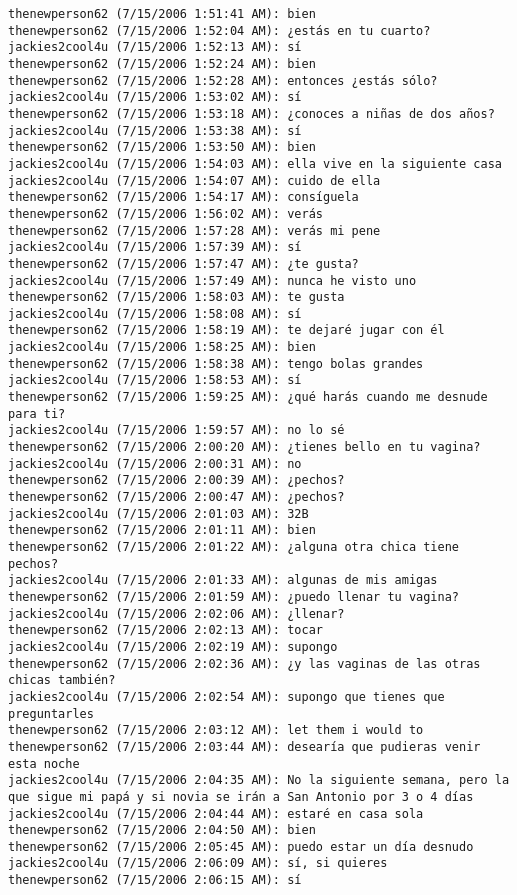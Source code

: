 \begin{verbatim}
thenewperson62 (7/15/2006 1:51:41 AM): bien
thenewperson62 (7/15/2006 1:52:04 AM): ¿estás en tu cuarto?
jackies2cool4u (7/15/2006 1:52:13 AM): sí
thenewperson62 (7/15/2006 1:52:24 AM): bien
thenewperson62 (7/15/2006 1:52:28 AM): entonces ¿estás sólo?
jackies2cool4u (7/15/2006 1:53:02 AM): sí
thenewperson62 (7/15/2006 1:53:18 AM): ¿conoces a niñas de dos años?
jackies2cool4u (7/15/2006 1:53:38 AM): sí
thenewperson62 (7/15/2006 1:53:50 AM): bien
jackies2cool4u (7/15/2006 1:54:03 AM): ella vive en la siguiente casa
jackies2cool4u (7/15/2006 1:54:07 AM): cuido de ella
thenewperson62 (7/15/2006 1:54:17 AM): consíguela
thenewperson62 (7/15/2006 1:56:02 AM): verás
thenewperson62 (7/15/2006 1:57:28 AM): verás mi pene
jackies2cool4u (7/15/2006 1:57:39 AM): sí
thenewperson62 (7/15/2006 1:57:47 AM): ¿te gusta?
jackies2cool4u (7/15/2006 1:57:49 AM): nunca he visto uno
thenewperson62 (7/15/2006 1:58:03 AM): te gusta
jackies2cool4u (7/15/2006 1:58:08 AM): sí
thenewperson62 (7/15/2006 1:58:19 AM): te dejaré jugar con él
jackies2cool4u (7/15/2006 1:58:25 AM): bien
thenewperson62 (7/15/2006 1:58:38 AM): tengo bolas grandes
jackies2cool4u (7/15/2006 1:58:53 AM): sí
thenewperson62 (7/15/2006 1:59:25 AM): ¿qué harás cuando me desnude para ti?
jackies2cool4u (7/15/2006 1:59:57 AM): no lo sé
thenewperson62 (7/15/2006 2:00:20 AM): ¿tienes bello en tu vagina?
jackies2cool4u (7/15/2006 2:00:31 AM): no
thenewperson62 (7/15/2006 2:00:39 AM): ¿pechos?
thenewperson62 (7/15/2006 2:00:47 AM): ¿pechos?
jackies2cool4u (7/15/2006 2:01:03 AM): 32B
thenewperson62 (7/15/2006 2:01:11 AM): bien
thenewperson62 (7/15/2006 2:01:22 AM): ¿alguna otra chica tiene pechos?
jackies2cool4u (7/15/2006 2:01:33 AM): algunas de mis amigas
thenewperson62 (7/15/2006 2:01:59 AM): ¿puedo llenar tu vagina?
jackies2cool4u (7/15/2006 2:02:06 AM): ¿llenar?
thenewperson62 (7/15/2006 2:02:13 AM): tocar
jackies2cool4u (7/15/2006 2:02:19 AM): supongo
thenewperson62 (7/15/2006 2:02:36 AM): ¿y las vaginas de las otras chicas también?
jackies2cool4u (7/15/2006 2:02:54 AM): supongo que tienes que preguntarles
thenewperson62 (7/15/2006 2:03:12 AM): let them i would to
thenewperson62 (7/15/2006 2:03:44 AM): desearía que pudieras venir esta noche
jackies2cool4u (7/15/2006 2:04:35 AM): No la siguiente semana, pero la que sigue mi papá y si novia se irán a San Antonio por 3 o 4 días
jackies2cool4u (7/15/2006 2:04:44 AM): estaré en casa sola
thenewperson62 (7/15/2006 2:04:50 AM): bien
thenewperson62 (7/15/2006 2:05:45 AM): puedo estar un día desnudo
jackies2cool4u (7/15/2006 2:06:09 AM): sí, si quieres
thenewperson62 (7/15/2006 2:06:15 AM): sí

\end{verbatim}
